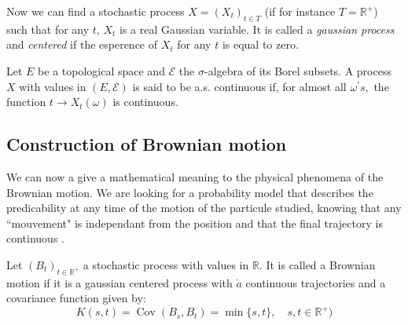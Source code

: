 Now we can find a stochastic process $X=\left(X_{t}\right)_{t \in T}$ (if for instance $T=\mathbb{R^+}$) such that for any $t$, $X_{t}$ is a real Gaussian variable. It is called a \textit{gaussian process} and \textit{centered} if the esperence of $X_t$ for any $t$ is equal to zero.
\begin{definition}
	Let $E$ be a topological space and $\mathscr{E}$ the $\sigma$-algebra of its Borel subsets. A process $X$ with values in $(E, \mathscr{E})$ is said to be a.s. continuous if, for almost all $\omega^{\prime} s,$ the function $t \rightarrow X_{t}(\omega)$ is continuous.
\end{definition}

\subsection{Construction of Brownian motion}
We can now a give a mathematical meaning to the physical phenomena of the Brownian motion. We are looking for a probability model that describes the predicability at any time of the motion of the particule studied, knowing that any ``mouvement" is independant from the position and that the final trajectory is continuous .

\begin{definition}
	Let $(B_t)_{t \in\mathbb{R^+}}$ a stochastic process with values in $\mathbb{R}$. It is called a Brownian motion if it is a gaussian centered process with $\dot{a}$ continuous trajectories and a covariance function given by:
	\[
	K(s, t)=\operatorname{Cov}\left(B_{s}, B_{t}\right)=\min \{s, t\}, \quad s, t \in\mathbb{R^+})
	\]
\end{definition}


